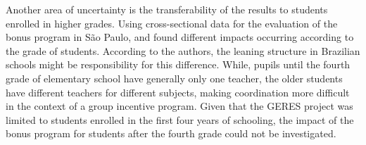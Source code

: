 \documentclass[a4paper, 12pt]{article}
\begin{document}





Another area of uncertainty is the transferability of the results to students enrolled in higher grades. Using cross-sectional data for the evaluation of the bonus program in São Paulo, \citet{lepine2016teacher} and \citet{oshiro2015impacto} found different impacts occurring according to the grade of students. According to the authors, the leaning structure in Brazilian schools might be responsibility for this difference. While, pupils until the fourth grade of elementary school have generally only one teacher, the older students have different teachers for different subjects, making coordination more difficult in the context of a group incentive program. Given that the GERES project was limited to students enrolled in the first four years of schooling, the impact of the bonus program for students after the fourth grade could not be investigated.




\end{document}
